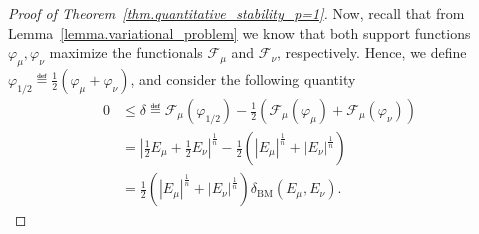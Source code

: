 \documentclass[a4paper, 10pt, twoside]{amsart}
\numberwithin{equation}{section}
\theoremstyle{plain}
\theoremstyle{definition}
\DeclareMathOperator{\BM}{\mathrm{BM}}
\begin{document}
\begin{proof}[Proof of Theorem~\ref{thm.quantitative_stability_p=1}]
    Now, recall that from Lemma~\ref{lemma.variational_problem} we know that both support functions $\varphi_\mu, \varphi_\nu$ maximize the functionals $\mathscr{F}_\mu$ and $\mathscr{F}_\nu$, respectively. Hence, we define $\varphi_{1/2} \eqdef \frac{1}{2}(\varphi_\mu + \varphi_\nu)$, and consider the following quantity
    \begin{equation}\label{eq.def_delta}
        \begin{aligned}
            0 
            &\le \delta \eqdef 
            \mathscr{F}_\mu(\varphi_{1/2}) 
            - 
            \frac{1}{2}\left(
                \mathscr{F}_\mu(\varphi_{\mu}) + \mathscr{F}_\mu(\varphi_{\nu})
            \right)\\ 
            &= 
            {\left|\frac{1}{2}E_\mu + \frac{1}{2}E_\nu\right|}^{\frac{1}{n}} 
            - 
            \frac{1}{2}\left(
                |E_\mu|^{\frac{1}{n}} + |E_\nu|^{\frac{1}{n}}
            \right)\\ 
            &= 
            \frac{1}{2}\left(
                |E_\mu|^{\frac{1}{n}} + |E_\nu|^{\frac{1}{n}}
            \right) 
            \delta_{\BM}(E_\mu,E_\nu).
        \end{aligned}
    \end{equation}


\end{proof}
\end{document}
